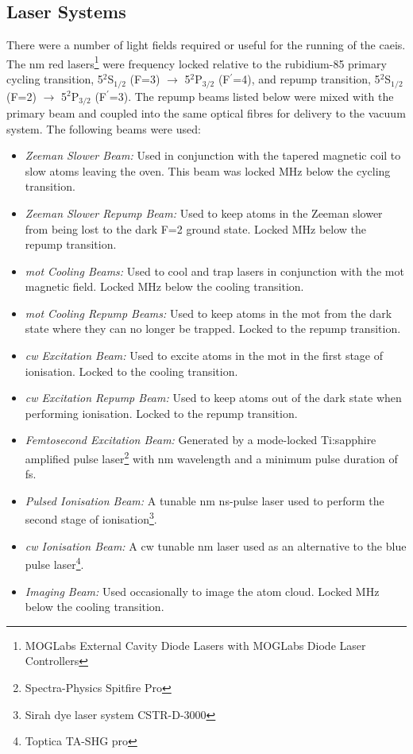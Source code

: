 \subsection{Laser Systems}
There were a number of light fields required or useful for the running of the \gls{caeis}.
The \unit[780]{nm} red lasers\footnote{MOGLabs External Cavity Diode Lasers with MOGLabs Diode Laser Controllers} were frequency locked relative to the rubidium-85 primary cycling transition, 5$^2$S$_{1/2}$ (F=3) $\rightarrow$ 5$^2$P$_{3/2}$ (F$^\prime$=4), and repump transition, 5$^2$S$_{1/2}$ (F=2) $\rightarrow$ 5$^2$P$_{3/2}$ (F$^\prime$=3).
The repump beams listed below were mixed with the primary beam and coupled into the same optical fibres for delivery to the vacuum system.
The following beams were used:
\begin{itemize}
    \item{\emph{Zeeman Slower Beam:}} Used in conjunction with the tapered magnetic coil to slow atoms leaving the oven. This beam was locked \unit[250]{MHz} below the cycling transition.
    \item{\emph{Zeeman Slower Repump Beam:}} Used to keep atoms in the Zeeman slower from being lost to the dark F=2 ground state. Locked \unit[250]{MHz} below the repump transition.
    \item{\emph{\Gls{mot} Cooling Beams:}} Used to cool and trap lasers in conjunction with the \gls{mot} magnetic field. Locked \unit[10]{MHz} below the cooling transition.
    \item{\emph{\Gls{mot} Cooling Repump Beams:}} Used to keep atoms in the \gls{mot} from the dark state where they can no longer be trapped. Locked to the repump transition.
    \item{\emph{\Gls{cw} Excitation Beam:}} Used to excite atoms in the \gls{mot} in the first stage of ionisation. Locked to the cooling transition.
    \item{\emph{\Gls{cw} Excitation Repump Beam:}} Used to keep atoms out of the dark state when performing ionisation. Locked to the repump transition.
    \item{\emph{Femtosecond Excitation Beam:}} Generated by a mode-locked Ti:sapphire amplified pulse laser\footnote{Spectra-Physics Spitfire Pro} with \unit[780-830]{nm} wavelength and a minimum pulse duration of \unit[35]{fs}.
    \item{\emph{Pulsed Ionisation Beam:}} A tunable \unit[457-493]{nm} \unit[10]{ns}-pulse laser used to perform the second stage of ionisation\footnote{Sirah dye laser system CSTR-D-3000}.
    \item{\emph{\Gls{cw} Ionisation Beam:}} A \gls{cw} tunable \unit[480]{nm} laser used as an alternative to the blue pulse laser\footnote{Toptica TA-SHG pro}.
    \item{\emph{Imaging Beam:}} Used occasionally to image the atom cloud. Locked \unit[4]{MHz} below the cooling transition.
\end{itemize}

